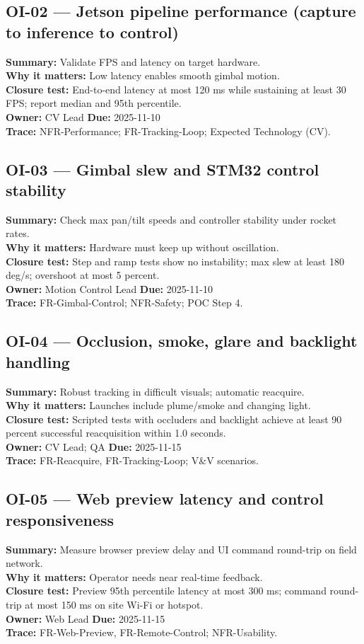 \documentclass[12pt]{article}
\begin{document}
\subsection*{OI-02 — Jetson pipeline performance (capture to inference to control)}
\textbf{Summary:} Validate FPS and latency on target hardware.\\
\textbf{Why it matters:} Low latency enables smooth gimbal motion.\\
\textbf{Closure test:} End-to-end latency at most 120 ms while sustaining at least 30 FPS; report median and 95th percentile.\\
\textbf{Owner:} CV Lead \quad \textbf{Due:} 2025-11-10\\
\textbf{Trace:} NFR-Performance; FR-Tracking-Loop; Expected Technology (CV).

\subsection*{OI-03 — Gimbal slew and STM32 control stability}
\textbf{Summary:} Check max pan/tilt speeds and controller stability under rocket rates.\\
\textbf{Why it matters:} Hardware must keep up without oscillation.\\
\textbf{Closure test:} Step and ramp tests show no instability; max slew at least 180 deg/s; overshoot at most 5 percent.\\
\textbf{Owner:} Motion Control Lead \quad \textbf{Due:} 2025-11-10\\
\textbf{Trace:} FR-Gimbal-Control; NFR-Safety; POC Step 4.

\subsection*{OI-04 — Occlusion, smoke, glare and backlight handling}
\textbf{Summary:} Robust tracking in difficult visuals; automatic reacquire.\\
\textbf{Why it matters:} Launches include plume/smoke and changing light.\\
\textbf{Closure test:} Scripted tests with occluders and backlight achieve at least 90 percent successful reacquisition within 1.0 seconds.\\
\textbf{Owner:} CV Lead; QA \quad \textbf{Due:} 2025-11-15\\
\textbf{Trace:} FR-Reacquire, FR-Tracking-Loop; V\&V scenarios.

\subsection*{OI-05 — Web preview latency and control responsiveness}
\textbf{Summary:} Measure browser preview delay and UI command round-trip on field network.\\
\textbf{Why it matters:} Operator needs near real-time feedback.\\
\textbf{Closure test:} Preview 95th percentile latency at most 300 ms; command round-trip at most 150 ms on site Wi-Fi or hotspot.\\
\textbf{Owner:} Web Lead \quad \textbf{Due:} 2025-11-15\\
\textbf{Trace:} FR-Web-Preview, FR-Remote-Control; NFR-Usability.
\end{document}
